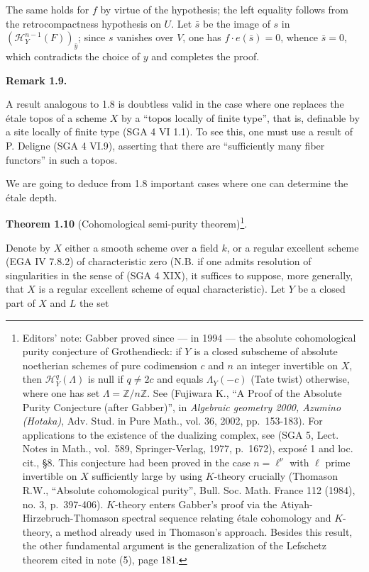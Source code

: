 \documentclass[
]{article}
\begin{document}
The same holds for \(f\) by virtue of the hypothesis; the left equality
follows from the retrocompactness hypothesis on \(U\). Let \(\bar{s}\)
be the image of \(s\) in \((\mathcal{H}^{n-1}_{Y}(F))_{\bar{y}}\); since
\(s\) vanishes over \(V\), one has \(f \cdot e(\bar{s}) = 0\), whence
\(\bar{s} = 0\), which contradicts the choice of \(y\) and completes the
proof.

\textbf{Remark 1.9.}

A result analogous to 1.8 is doubtless valid in the case where one
replaces the étale topos of a scheme \(X\) by a ``topos locally of
finite type'', that is, definable by a site locally of finite type (SGA
4 VI 1.1). To see this, one must use a result of P. Deligne (SGA 4
VI.9), asserting that there are ``sufficiently many fiber functors'' in
such a topos.

We are going to deduce from 1.8 important cases where one can determine
the étale depth.

\textbf{Theorem 1.10} (Cohomological semi-purity theorem)\footnote{Editors'
  note: Gabber proved since --- in 1994 --- the absolute cohomological
  purity conjecture of Grothendieck: if \(Y\) is a closed subscheme of
  absolute noetherian schemes of pure codimension \(c\) and \(n\) an
  integer invertible on \(X\), then \(\mathcal{H}^{q}_{Y}(\Lambda)\) is
  null if \(q \neq 2c\) and equals \(\Lambda_{Y}(-c)\) (Tate twist)
  otherwise, where one has set \(\Lambda = \mathbb{Z}/n\mathbb{Z}\). See
  (Fujiwara K., ``A Proof of the Absolute Purity Conjecture (after
  Gabber)'', in \emph{Algebraic geometry 2000, Azumino (Hotaka)}, Adv.
  Stud. in Pure Math., vol. 36, 2002, pp.~153-183). For applications to
  the existence of the dualizing complex, see (SGA 5, Lect. Notes in
  Math., vol.~589, Springer-Verlag, 1977, p.~1672), exposé 1 and loc.
  cit., §8. This conjecture had been proved in the case
  \(n = \ell^{\nu}\) with \(\ell\) prime invertible on \(X\)
  sufficiently large by using \(K\)-theory crucially (Thomason R.W.,
  ``Absolute cohomological purity'', Bull. Soc. Math. France 112 (1984),
  no. 3, p.~397-406). \(K\)-theory enters Gabber's proof via the
  Atiyah-Hirzebruch-Thomason spectral sequence relating étale cohomology
  and \(K\)-theory, a method already used in Thomason's approach.
  Besides this result, the other fundamental argument is the
  generalization of the Lefschetz theorem cited in note (5), page 181.}.

Denote by \(X\) either a smooth scheme over a field \(k\), or a regular
excellent scheme (EGA IV 7.8.2) of characteristic zero (N.B. if one
admits resolution of singularities in the sense of (SGA 4 XIX), it
suffices to suppose, more generally, that \(X\) is a regular excellent
scheme of equal characteristic). Let \(Y\) be a closed part of \(X\) and
\(L\) the set
\end{document}
